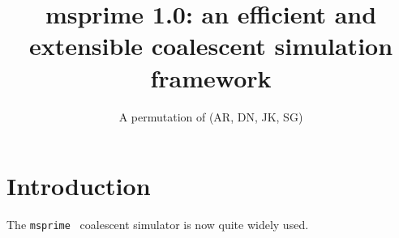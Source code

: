 \documentclass{article}
\newcommand{\msprime}[0]{\texttt{msprime}}
\begin{document}
\title{msprime 1.0: an efficient and extensible coalescent simulation framework}
\author{A permutation of (AR, DN, JK, SG)}

\abstract{

}

\section*{Introduction}

The \msprime~\citep{kelleher2016efficient} coalescent simulator is now quite
widely used.




\end{document}
